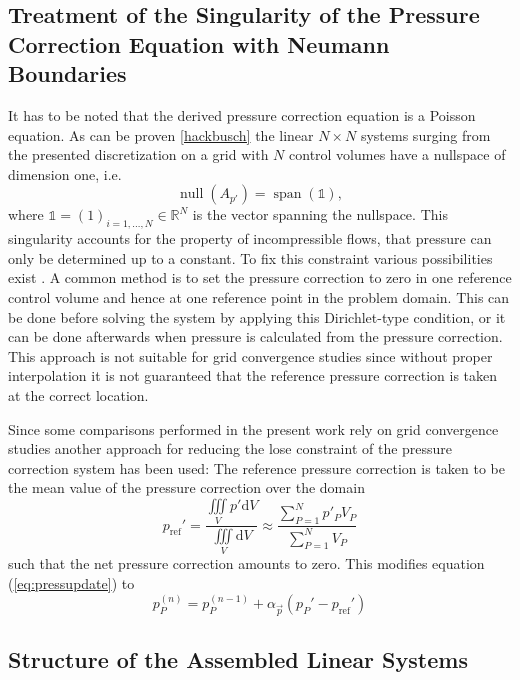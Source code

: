   \subsection{Treatment of the Singularity of the Pressure Correction Equation with Neumann Boundaries}

  It has to be noted that the derived pressure correction equation is a Poisson equation. As can be proven \ref{hackbusch} the linear \(N \times N\) systems surging from the presented discretization on a grid with \(N\) control volumes have a nullspace of dimension one, i.e.
  \begin{displaymath}
    \operatorname{null}(A_{p'}) = \operatorname{span}(\mathbb{1}),
  \end{displaymath}
  where \(\mathbb{1} = (1)_{i = 1,\dots,N} \in \mathbb{R}^N\) is the vector spanning the nullspace. This singularity accounts for the property of incompressible flows, that pressure can only be determined up to a constant. To fix this constraint various possibilities exist \cite{ferziger02}. A common method is to set the pressure correction to zero in one reference control volume and hence at one reference point in the problem domain. This can be done before solving the system by applying this Dirichlet-type condition, or it can be done afterwards when pressure is calculated from the pressure correction. This approach is not suitable for grid convergence studies since without proper interpolation it is not guaranteed that the reference pressure correction is taken at the correct location.

  Since some comparisons performed in the present work rely on grid convergence studies another approach for reducing the lose constraint of the pressure correction system has been used: The reference pressure correction is taken to be the mean value of the pressure correction over the domain 
  \begin{displaymath}
    p_{\text{ref}}' 
    = \frac{\iiint\limits_V p' \mathrm{d}V}{\iiint\limits_V \mathrm{d}V} 
      \approx \frac{\sum_{P = 1}^N p'_P V_P}{\sum_{P = 1}^N V_P}
  \end{displaymath}
  such that the net pressure correction amounts to zero. This modifies equation (\ref{eq:pressupdate}) to 
  \begin{equation}
    \label{eq:pressupdate2}
    p_P^{(n)} = p_P^{(n-1)} + \alpha_{\vec{p}} \left( p_P' - p_{\text{ref}}' \right)
  \end{equation}

  \subsection{Structure of the Assembled Linear Systems}

